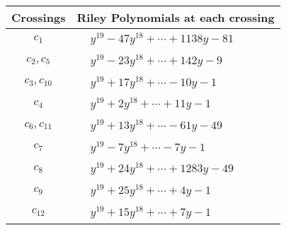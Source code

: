 \documentclass[1p]{elsarticle_modified}
\theoremstyle{definition}
\begin{document}
\begin{tabular}{m{50pt}|m{274pt}}
Crossings & \hspace{64pt}Riley Polynomials at each crossing \\
\hline $$\begin{aligned}c_{1}\end{aligned}$$&$\begin{aligned}
&y^{19}-47 y^{18}+\cdots+1138 y-81
\end{aligned}$\\
\hline $$\begin{aligned}c_{2},c_{5}\end{aligned}$$&$\begin{aligned}
&y^{19}-23 y^{18}+\cdots+142 y-9
\end{aligned}$\\
\hline $$\begin{aligned}c_{3},c_{10}\end{aligned}$$&$\begin{aligned}
&y^{19}+17 y^{18}+\cdots-10 y-1
\end{aligned}$\\
\hline $$\begin{aligned}c_{4}\end{aligned}$$&$\begin{aligned}
&y^{19}+2 y^{18}+\cdots+11 y-1
\end{aligned}$\\
\hline $$\begin{aligned}c_{6},c_{11}\end{aligned}$$&$\begin{aligned}
&y^{19}+13 y^{18}+\cdots-61 y-49
\end{aligned}$\\
\hline $$\begin{aligned}c_{7}\end{aligned}$$&$\begin{aligned}
&y^{19}-7 y^{18}+\cdots-7 y-1
\end{aligned}$\\
\hline $$\begin{aligned}c_{8}\end{aligned}$$&$\begin{aligned}
&y^{19}+24 y^{18}+\cdots+1283 y-49
\end{aligned}$\\
\hline $$\begin{aligned}c_{9}\end{aligned}$$&$\begin{aligned}
&y^{19}+25 y^{18}+\cdots+4 y-1
\end{aligned}$\\
\hline $$\begin{aligned}c_{12}\end{aligned}$$&$\begin{aligned}
&y^{19}+15 y^{18}+\cdots+7 y-1
\end{aligned}$\\
\hline
\end{tabular}\\~\\
\end{document}

